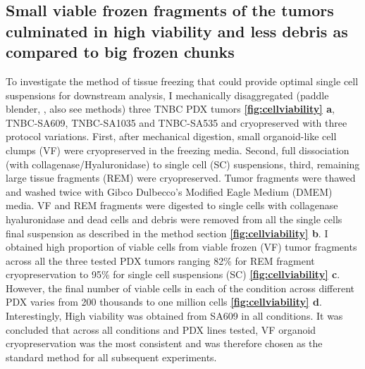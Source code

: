 

\subsection{Small viable frozen fragments of the tumors culminated in high viability and less debris as compared to big frozen chunks}
To investigate the method of tissue freezing that could provide optimal single cell suspensions for downstream analysis, I mechanically disaggregated (paddle blender, \cite{eirew2015dynamics}, also see methods) three TNBC PDX tumors \textbf{\autoref{fig:cellviability} a}, TNBC-SA609, TNBC-SA1035 and TNBC-SA535 and cryopreserved with three protocol variations. First, after mechanical digestion, small organoid-like cell clumps (VF) were cryopreserved in the freezing media. Second, full dissociation (with collagenase/Hyaluronidase) to single cell (SC) suspensions, third, remaining large tissue fragments (REM) were cryopreserved. 
Tumor fragments were thawed and washed twice with 
Gibco Dulbecco's Modified Eagle Medium (DMEM) media. VF and REM fragments were digested to single cells with collagenase hyaluronidase and dead cells and debris were removed from all the single cells final suspension as described in the method section \textbf{\autoref{fig:cellviability} b}. I obtained high proportion of viable cells from viable frozen (VF) tumor fragments across all the three tested PDX tumors ranging 82\% for REM fragment cryopreservation to 95\% for single cell suspensions (SC) \textbf{\autoref{fig:cellviability} c}.
However, the final number of viable cells in each of the condition across different PDX varies from 200 thousands to one million cells \textbf{\autoref{fig:cellviability} d}. Interestingly, High viability was obtained from SA609 in all conditions. 
It was concluded that across all conditions and PDX lines tested, VF organoid cryopreservation was the most consistent and was therefore chosen as the standard method for all subsequent experiments.

